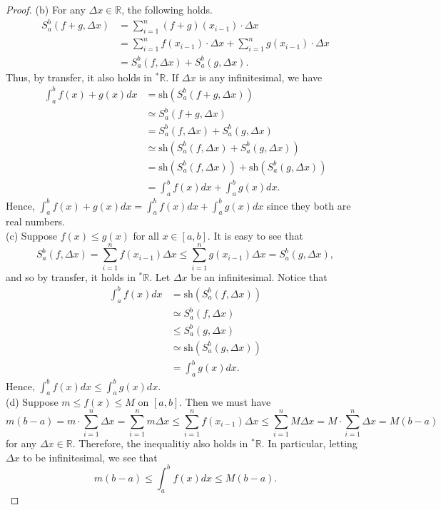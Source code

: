 \documentclass[a4paper, 11pt, openany]{book}
\theoremstyle{plain}
\theoremstyle{plain}
\newcommand{\R}{\mathbb{R}}
\newcommand{\hyp}{{}^*}
\newcommand{\sh}{\text{sh}}
\newcommand{\Del}{\Delta}
\begin{document}
\begin{proof}
      (b) For any $\Del x \in \R$, the following holds. 
        \begin{align*}
          S_a^b (f+g, \Del x) &= \sum_{i=1}^n (f+g)(x_{i-1}) \cdot \Del x \\
          &=\sum_{i=1}^n f(x_{i-1}) \cdot \Del x + \sum_{i=1}^n g(x_{i-1}) \cdot \Del x \\
          &= S_a^b (f, \Del x) + S_a^b (g, \Del x).
        \end{align*}
        Thus, by transfer, it also holds in $\hyp \R$. If $\Del x$ is any infinitesimal, we have 
        \begin{align*}
          \int_a^b f(x)+g(x) dx &= \sh(S_a^b (f+g, \Del x)) \\
          &\simeq S_a^b(f+g, \Del x) \\
          &=S_a^b (f, \Del x) + S_a^b (g, \Del x) \\
          &\simeq \sh(S_a^b (f, \Del x) + S_a^b (g, \Del x)) \\
          &= \sh( S_a^b (f, \Del x))+ \sh(S_a^b (g, \Del x) ) \\
          &=\int_a^b f(x) dx + \int_a^b g(x) dx.
        \end{align*}
        Hence, $\int_a^b f(x)+g(x) dx = \int_a^b f(x) dx + \int_a^b g(x) dx$ since they both are real numbers. \\

        (c) Suppose $f(x) \leq g(x)$ for all $x \in [a,b]$. It is easy to see that $$S_a^b(f, \Del x)=\sum_{i=1}^n f(x_{i-1}) \Del x \leq \sum_{i=1}^n g(x_{i-1}) \Del x=S_a^b (g, \Del x),$$
        and so by transfer, it holds in $\hyp \R$. Let $\Del x$ be an infinitesimal. Notice that 
        \begin{align*}
          \int_a^b f(x) dx &=\sh(S_a^b(f, \Del x))  \\
          &\simeq S_a^b (f, \Del x) \\
          & \leq S_a^b (g, \Del x) \\
          &\simeq \sh(S_a^b (g, \Del x)) \\
          &=\int_a^b g(x) dx.
        \end{align*}
        Hence, $\int_a^b f(x) dx \leq \int_a^b g(x) dx$. \\

        (d) Suppose $m\leq f(x) \leq M$ on $[a,b]$. Then we must have $$m(b-a)=m \cdot \sum_{i=1}^n \Del x=\sum_{i=1}^n m \Del x \leq \sum_{i=1}^n f(x_{i-1}) \Del x \leq \sum_{i=1}^n M \Del x =M \cdot \sum_{i=1}^n \Del x=M (b-a)$$ for any $\Del x \in \R$. Therefore, the inequalitiy also holds in $\hyp \R$. In particular, letting $\Del x$ to be infinitesimal, we see that $$m(b-a) \leq \int_a^b f(x) dx \leq M(b-a).$$
    \end{proof}
\end{document}
